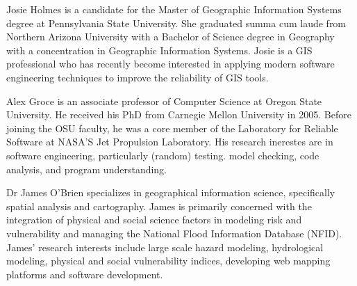 \documentclass{article}
\begin{document}
Josie Holmes is a candidate for the Master of Geographic Information Systems degree at Pennsylvania State University.  She graduated summa cum laude from Northern Arizona University with a Bachelor of Science degree in Geography with a concentration in Geographic Information Systems.  Josie is a GIS professional who has recently become interested in applying modern software engineering techniques to improve the reliability of GIS tools.

\vspace{0.5in}

Alex Groce is an associate professor of Computer Science at Oregon State University.  He received his PhD from Carnegie Mellon University in 2005.  Before joining the OSU faculty, he was a core member of the Laboratory for Reliable Software at NASA'S Jet Propulsion Laboratory.  His research inerestes are in software engineering, particularly (random) testing. model checking, code analysis, and program understanding.

\vspace{0.5in}

Dr James O’Brien specializes in geographical information science, specifically spatial analysis and cartography.  James is primarily concerned with the integration of physical and social science factors in modeling risk and vulnerability and managing the National Flood Information Database (NFID).  James’ research interests include large scale hazard modeling, hydrological modeling, physical and social vulnerability indices, developing web mapping platforms and software development.
\end{document}

